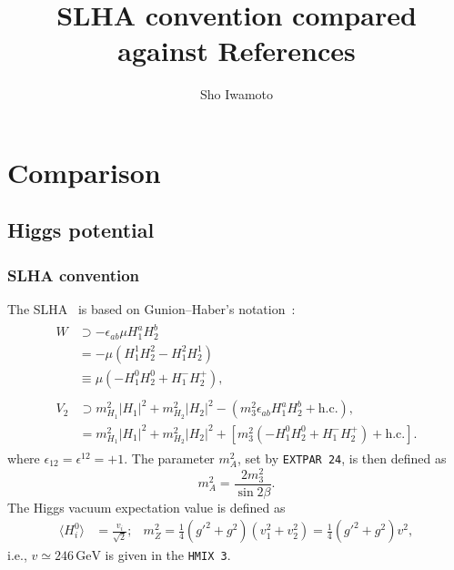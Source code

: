 \documentclass[a4paper,11pt,captions=tableheading,DIV=12]{scrartcl}
\title{SLHA convention compared against References}
\author{Sho Iwamoto}
\date{}
\newcommand\unit[1]{\,\mathrm{#1}}
\newcommand\GeV{\unit{GeV}}
\begin{document}
\maketitle
\section{Comparison}
\subsection{Higgs potential}

\subsubsection{SLHA convention}
The SLHA~\cite{SLHA} is based on Gunion--Haber's notation~\cite{GH}:
\begin{align}
\begin{split}
  W &\supset-\epsilon_{ab}
 \mu H_1^aH_2^b
 \\&=-\mu(H_1^1H_2^2-H_1^2H_2^1)
 \\&\equiv \mu(-H_1^0H_2^0+H_1^-H_2^+),
\end{split}
 \tag{SLHA:3}\\
\begin{split}
  V_2 &\supset
  m_{H_{1}}^{2}|H_1|^2
 + m_{H_{2}}^{2}|H_2|^2
 - (m_3^2\epsilon_{ab}H_1^aH_2^b +\text{h.c.}),
\\
&=
  m_{H_{1}}^{2}|H_1|^2
 + m_{H_{2}}^{2}|H_2|^2
+ \left[m_3^2 (-H_1^0H_2^0+H_1^-H_2^+) +\text{h.c.}\right].
\end{split}
 \tag{SLHA:7}
\end{align}
where $\epsilon_{12}=\epsilon^{12}=+1$.
The parameter $m_A^2$, set by \texttt{EXTPAR 24}, is then defined as
\begin{equation}
 m_A^2 = \frac{2m_3^2}{\sin2\beta}.
\tag{SLHA:8}
\end{equation}
The Higgs vacuum expectation value is defined as
\begin{align}
 \langle{H_i^0}\rangle&=\frac{v_i}{\sqrt{2}};&
 m_Z^2 = \frac14(g'^2+g^2)(v_1^2+v_2^2)=\frac14(g'^2+g^2)v^2,
\end{align}
i.e., $v\simeq246\GeV$ is given in the \texttt{HMIX 3}.
\end{document}
